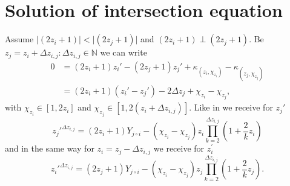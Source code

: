 \section{Solution of intersection equation}
\label{s:solutionofintersection}
Assume $\vert\left(2z_{i} + 1\right)\vert < \vert\left(2z_{j} + 1\right)\vert$ and $\left(2z_{i} + 1\right) \perp \left(2z_{j} + 1\right)$. Be $z_{j} = z_{i} + \Delta z_{i,j}:\Delta z_{i,j} \in \mathbb{N}$ we can write
\begin{equation}\begin{split}
	0 & = \left(2z_{i} + 1\right)z_{i}\prime - \left(2z_{j} + 1\right)z_{j}\prime + \kappa_{\left(z_{i}, \chi_{z_{i}}\right)} - \kappa_{\left(z_{j}, \chi_{z_{j}}\right)} \\
	& = \left(2z_{i} + 1\right)\left(z_{i}\prime - z_{j}\prime\right) - 2\Delta z_{j} + \chi_{z_{i}} - \chi_{z_{j}},
\end{split}\label{eq:intersectionDeltaz}\end{equation}
with $\chi_{z_{i}} \in [ 1, 2z_{i}]$ and $\chi_{z_{j}} \in [1, 2\left(z_{i} + \Delta z_{i,j}\right)]$. Like in \cite{2014arXiv1411.2824Z} we receive for $z_{j}\prime$
\begin{equation}
	z_{j}\prime^{\Delta z_{i,j}} = \left(2z_{i} + 1\right)Y_{j \circ i} - \left(\chi_{z_{i}} - \chi_{z_{j}}\right)z_{i}\prod_{k=2}^{\Delta z_{i,j}} \left(1 + \frac{2}{k}z_{i}\right)
\label{eq:zjsolution}\end{equation}
and in the same way for $z_{i} = z_{j} - \Delta z_{i,j}$ we receive for $z_{i}^{\prime}$
\begin{equation}
	z_{i}\prime^{\Delta z_{i,j}} = \left(2z_{j} + 1\right)Y_{j \circ i} - \left(\chi_{z_{i}} - \chi_{z_{j}}\right)z_{j}\prod_{k=2}^{\Delta z_{i,j}} \left(1 + \frac{2}{k}z_{j}\right).
\label{eq:zjsolution}\end{equation}






\nocite{*}
\newpage
%



